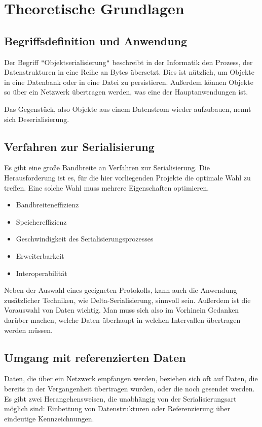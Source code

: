 
\chapter{Theoretische Grundlagen}
\section{Begriffsdefinition und Anwendung}

Der Begriff \verb|"|Objektserialisierung\verb|"| beschreibt in der Informatik den Prozess, der Datenstrukturen in eine Reihe an Bytes übersetzt. Dies ist nützlich, um Objekte in eine Datenbank oder in eine Datei zu persistieren. Außerdem können Objekte so über ein Netzwerk übertragen werden, was eine der Hauptanwendungen ist. \cite{SerialisationIntroduction}

Das Gegenstück, also Objekte aus einem Datenstrom wieder aufzubauen, nennt sich Deserialisierung.

\section{Verfahren zur Serialisierung}

Es gibt eine große Bandbreite an Verfahren zur Serialisierung. Die Herausforderung ist es, für die hier vorliegenden Projekte die optimale Wahl zu treffen. Eine solche Wahl muss mehrere Eigenschaften optimieren. \cite{Performance}

\begin{itemize}
	\item Bandbreiteneffizienz
	\item Speichereffizienz
	\item Geschwindigkeit des Serialisierungsprozesses
	\item Erweiterbarkeit
	\item Interoperabilität
\end{itemize}

Neben der Auswahl eines geeigneten Protokolls, kann auch die Anwendung zusätzlicher Techniken, wie Delta-Serialisierung, sinnvoll sein. Außerdem ist die Vorauswahl von Daten wichtig. Man muss sich also im Vorhinein Gedanken darüber machen, welche Daten überhaupt in welchen Intervallen übertragen werden müssen.

\section{Umgang mit referenzierten Daten}

Daten, die über ein Netzwerk empfangen werden, beziehen sich oft auf Daten, die bereits in der Vergangenheit übertragen wurden, oder die noch gesendet werden. Es gibt zwei Herangehensweisen, die unabhängig von der Serialisierungsart möglich sind: Einbettung von Datenstrukturen oder Referenzierung über eindeutige Kennzeichnungen.

